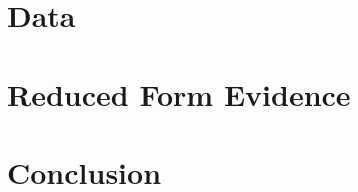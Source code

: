 \documentclass{article}
\begin{document}
\section{Data}



\section{Reduced Form Evidence}



\section{Conclusion}



\nocite{*}

\printbibliography
\end{document}
